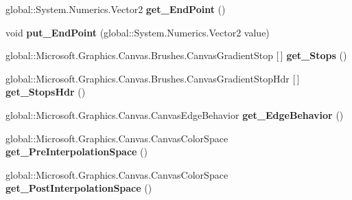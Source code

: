 \begin{DoxyCompactItemize}
global\+::\+System.\+Numerics.\+Vector2 {\bfseries get\+\_\+\+End\+Point} ()
\item 
\mbox{\label{class_microsoft_1_1_graphics_1_1_canvas_1_1_brushes_1_1_canvas_linear_gradient_brush_a62c42f4087bf4d9485a3a063483256a4}} 
void {\bfseries put\+\_\+\+End\+Point} (global\+::\+System.\+Numerics.\+Vector2 value)
\item 
\mbox{\label{class_microsoft_1_1_graphics_1_1_canvas_1_1_brushes_1_1_canvas_linear_gradient_brush_ad55e7221f7c2cd991c552a4c2189d4b6}} 
global\+::\+Microsoft.\+Graphics.\+Canvas.\+Brushes.\+Canvas\+Gradient\+Stop \mbox{[}$\,$\mbox{]} {\bfseries get\+\_\+\+Stops} ()
\item 
\mbox{\label{class_microsoft_1_1_graphics_1_1_canvas_1_1_brushes_1_1_canvas_linear_gradient_brush_ae3b9a2022af08e1af2ef533bdf9ae164}} 
global\+::\+Microsoft.\+Graphics.\+Canvas.\+Brushes.\+Canvas\+Gradient\+Stop\+Hdr \mbox{[}$\,$\mbox{]} {\bfseries get\+\_\+\+Stops\+Hdr} ()
\item 
\mbox{\label{class_microsoft_1_1_graphics_1_1_canvas_1_1_brushes_1_1_canvas_linear_gradient_brush_ac53e2151cbaede69b2072192ba7af46f}} 
global\+::\+Microsoft.\+Graphics.\+Canvas.\+Canvas\+Edge\+Behavior {\bfseries get\+\_\+\+Edge\+Behavior} ()
\item 
\mbox{\label{class_microsoft_1_1_graphics_1_1_canvas_1_1_brushes_1_1_canvas_linear_gradient_brush_ae768f664c240426af7715b7aadf47101}} 
global\+::\+Microsoft.\+Graphics.\+Canvas.\+Canvas\+Color\+Space {\bfseries get\+\_\+\+Pre\+Interpolation\+Space} ()
\item 
\mbox{\label{class_microsoft_1_1_graphics_1_1_canvas_1_1_brushes_1_1_canvas_linear_gradient_brush_a83d5f9d271cffb836af96b6da7aa38fa}} 
global\+::\+Microsoft.\+Graphics.\+Canvas.\+Canvas\+Color\+Space {\bfseries get\+\_\+\+Post\+Interpolation\+Space} ()

\end{DoxyCompactItemize}
